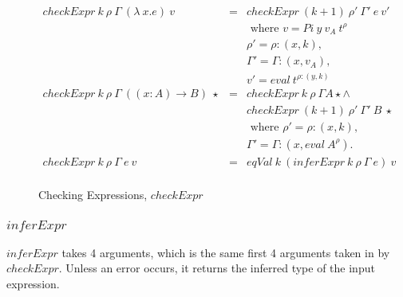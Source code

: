 \documentclass[acmsmall]{acmart}
\begin{document}
\begin{figure}[H]
  \begin{equation*}
    \begin{aligned}
      checkExpr \: k \: \rho \: \Gamma \: (\lambda \: x.e) \: v  & = & checkExpr \: (k + 1) \: \rho' \: \Gamma' \:e \: v'          \\
                                                                 &   & \textrm{ where } v = Pi \: y \: v_A \: t^{\rho}             \\ 
                                                                 &   & \rho' = \rho : (x, k),                                      \\
                                                                 &   & \Gamma' = \Gamma : (x, v_A),                                \\
                                                                 &   & v' = eval \: t^{\rho:(y, k)}                                \\
      checkExpr \: k \: \rho \: \Gamma \: ((x:A) \to B) \: \star & = & checkExpr \: k \: \rho \: \Gamma A \star              \land \\
                                                                 &   & checkExpr \: (k+1) \: \rho' \: \Gamma' \: B \: \star        \\
                                                                 &   & \textrm{ where } \rho' = \rho : (x, k),                     \\
                                                                 &   & \Gamma' = \Gamma:(x, eval \: A^{\rho}).                     \\
      checkExpr \: k \: \rho \: \Gamma \: e \: v                 & = & eqVal \: k \: (inferExpr \: k \: \rho \: \Gamma \: e) \: v  \\
    \end{aligned}
  \end{equation*}
  \caption{Checking Expressions, $checkExpr$}
\end{figure}

\subsubsection{$inferExpr$}

$inferExpr$ takes 4 arguments, which is the same first 4 arguments taken in by $checkExpr$. Unless an error occurs, it returns the inferred type of the input expression.
\end{document}
